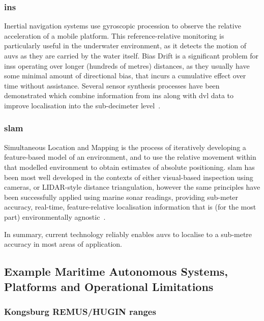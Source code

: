 \subsubsection{\gls{ins}}
Inertial navigation systems use gyroscopic procession to observe the relative acceleration of a mobile platform.
This reference-relative monitoring is particularly useful in the underwater environment, as it detects the motion of \glspl{auv} as they are carried by the water itself.
Bias Drift is a significant problem for \glspl{ins} operating over longer (hundreds of metres) distances, as they usually have some minimal amount of directional bias, that incurs a cumulative effect over time without assistance.
Several sensor synthesis processes have been demonstrated which combine information from \gls{ins} along with \gls{dvl} data to improve localisation into the sub-decimeter level~\cite{Jalving2003,Liu2014,Allotta2015}.
\subsubsection{\gls{slam}}
Simultaneous Location and Mapping is the process of iteratively developing a feature-based model of an environment, and to use the relative movement within that modelled environment to obtain estimates of absolute positioning.
\gls{slam} has been most well developed in the contexts of either visual-based inspection using cameras, or LIDAR-style distance triangulation, however the same principles have been successfully applied using marine sonar readings, providing sub-meter accuracy, real-time, feature-relative localisation information that is (for the most part) environmentally agnostic~\cite{Williams2000}.

\vspace{\baselineskip}

In summary, current technology reliably enables \glspl{auv} to localise to a sub-metre accuracy in most areas of application.

\subsection{Example Maritime Autonomous Systems, Platforms and Operational Limitations}\label{sec:auv_examples}

\subsubsection{Kongsburg REMUS/HUGIN ranges}

